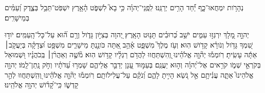 \documentclass{openreader}
\begin{document}
נְהָרֹ֥ות יִמְחֲאוּ־כָ֑ף יַ֝֗חַד הָרִ֥ים יְרַנֵּֽנוּ׃ 
לִֽפְֽנֵי־יְהוָ֗ה כִּ֥י בָא֮ לִשְׁפֹּ֢ט הָ֫אָ֥רֶץ יִשְׁפֹּֽט־תֵּבֵ֥ל בְּצֶ֑דֶק וְ֝עַמִּ֗ים בְּמֵישָׁרִֽים׃ 

יְהוָ֣ה מָ֭לָךְ יִרְגְּז֣וּ עַמִּ֑ים יֹשֵׁ֥ב כְּ֝רוּבִ֗ים תָּנ֥וּט הָאָֽרֶץ׃ 
יְ֭הוָה בְּצִיֹּ֣ון גָּדֹ֑ול וְרָ֥ם ה֝֗וּא עַל־כָּל־הָֽעַמִּֽים׃ 
יֹוד֣וּ שִׁ֭מְךָ גָּדֹ֥ול וְנֹורָ֗א קָדֹ֥ושׁ הֽוּא׃ 
וְעֹ֥ז מֶלֶךְ֮ מִשְׁפָּ֢ט אָ֫הֵ֥ב אַ֭תָּה כֹּונַ֣נְתָּ מֵישָׁרִ֑ים מִשְׁפָּ֥ט וּ֝צְדָקָ֗ה בְּיַעֲקֹ֤ב׀ אַתָּ֬ה עָשִֽׂיתָ׃ 
רֹֽומְמ֡וּ יְה֘וָ֤ה אֱלֹהֵ֗ינוּ וְֽ֭הִשְׁתַּחֲווּ לַהֲדֹ֥ם רַגְלָ֗יו קָדֹ֥ושׁ הֽוּא׃ 
מֹ֘שֶׁ֤ה וְאַהֲרֹ֨ן׀ בְּֽכֹהֲנָ֗יו וּ֭שְׁמוּאֵל בְּקֹרְאֵ֣י שְׁמֹ֑ו קֹרִ֥אים אֶל־יְ֝הוָ֗ה וְה֣וּא יַעֲנֵֽם׃ 
בְּעַמּ֣וּד עָ֭נָן יְדַבֵּ֣ר אֲלֵיהֶ֑ם שָׁמְר֥וּ עֵ֝דֹתָ֗יו וְחֹ֣ק נָֽתַן־לָֽמֹו׃ 
יְהוָ֣ה אֱלֹהֵינוּ֮ אַתָּ֢ה עֲנִ֫יתָ֥ם אֵ֣ל נֹ֭שֵׂא הָיִ֣יתָ לָהֶ֑ם וְ֝נֹקֵ֗ם עַל־עֲלִילֹותָֽם׃ 
רֹֽומְמ֡וּ יְה֘וָ֤ה אֱלֹהֵ֗ינוּ וְ֭הִֽשְׁתַּחֲווּ לְהַ֣ר קָדְשֹׁ֑ו כִּֽי־קָ֝דֹ֗ושׁ יְהוָ֥ה אֱלֹהֵֽינוּ׃ 
\end{document}
